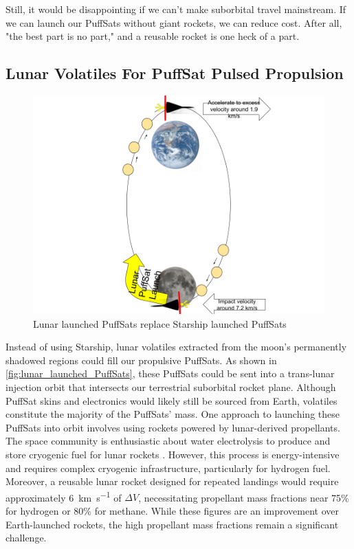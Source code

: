 \documentclass{article}
\begin{document}
{Still, it would be disappointing if we can't make suborbital travel mainstream.   If we can launch our PuffSats without giant rockets, we can reduce cost.   After all, "the best part is no part," \cite{best_part_no_part} and a reusable rocket is one heck of a part.

\subsection{Lunar Volatiles For PuffSat Pulsed Propulsion}

\begin{figure}[htbp]
    \centering
    \includegraphics[width=0.5\linewidth]{images/Water Drawing From Moon.png}
    \caption{Lunar launched PuffSats replace Starship launched PuffSats \cite{earth_image} \cite{moon_image}}
    \label{fig:lunar_launched_PuffSats}
\end{figure}
Instead of using Starship, lunar volatiles extracted from the moon's permanently shadowed regions could fill our propulsive PuffSats. As shown in \autoref{fig:lunar_launched_PuffSats}, these PuffSats could be sent into a trans-lunar injection orbit that intersects our terrestrial suborbital rocket plane. Although PuffSat skins and electronics would likely still be sourced from Earth, volatiles constitute the majority of the PuffSats' mass. One approach to launching these PuffSats into orbit involves using rockets powered by lunar-derived propellants. The space community is enthusiastic about water electrolysis to produce and store cryogenic fuel for lunar rockets \cite{nasa_water}. However, this process is energy-intensive and requires complex cryogenic infrastructure, particularly for hydrogen fuel. Moreover, a reusable lunar rocket designed for repeated landings would require approximately \SI{6}{\km\per\second} of $\Delta V$, necessitating propellant mass fractions near 75\% for hydrogen or 80\% for methane. While these figures are an improvement over Earth-launched rockets, the high propellant mass fractions remain a significant challenge.   

}
\end{document}
